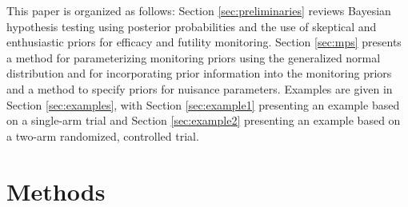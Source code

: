 \documentclass[AMA,STIX1COL,doublespace]{WileyNJD-v2}
\begin{document}
This paper is organized as follows: %
Section \ref{sec:preliminaries} reviews Bayesian hypothesis testing using posterior probabilities and the use of  skeptical and enthusiastic priors for efficacy and futility monitoring. 
%
Section \ref{sec:mps} presents a method for parameterizing monitoring priors using the generalized normal distribution and for incorporating prior information into the monitoring priors and a method to specify priors for nuisance parameters.
%
Examples are given in Section \ref{sec:examples}, with Section \ref{sec:example1} presenting an example based on a single-arm trial and Section \ref{sec:example2} presenting an example based on a two-arm randomized, controlled trial.
\section{Methods}\label{sec:methods}
\end{document}
